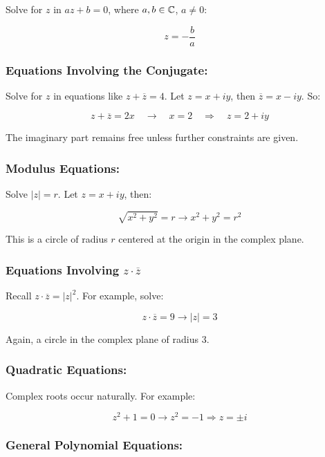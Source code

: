 Solve for \( z \) in \( az + b = 0 \), where \( a, b \in \mathbb{C} \), \( a \neq 0 \):
	
\[
	z = -\frac{b}{a}
\]

\subsubsection{Equations Involving the Conjugate:}

Solve for \( z \) in equations like \( z + \overline{z} = 4 \).
Let \( z = x + iy \), then \( \overline{z} = x - iy \). So:
	      
\[
	z + \overline{z} = 2x \quad \to \quad x = 2 \quad \Rightarrow \quad z = 2 + iy
\]
	      
The imaginary part remains free unless further constraints are given.

\subsubsection{Modulus Equations:}

Solve \( |z| = r \). Let \( z = x + iy \), then:
	      
\[
	\sqrt{x^2 + y^2} = r \to x^2 + y^2 = r^2
\]

This is a circle of radius \( r \) centered at the origin in the complex plane.

\subsubsection{Equations Involving \texorpdfstring{\( z \cdot \overline{z} \)}{}}

Recall \( z \cdot \overline{z} = |z|^2 \). For example, solve:
	      
\[
	z \cdot \overline{z} = 9 \to |z| = 3
\]

Again, a circle in the complex plane of radius 3.

\subsubsection{Quadratic Equations:}

Complex roots occur naturally. For example:

\[
	z^2 + 1 = 0 \to z^2 = -1 \Rightarrow z = \pm i
\]

\subsubsection{General Polynomial Equations:}

